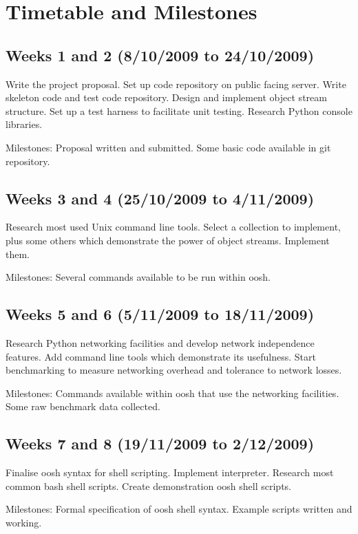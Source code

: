\documentclass[12pt]{article}
\begin{document}
\section*{Timetable and Milestones}

\subsection*{Weeks 1 and 2 (8/10/2009 to 24/10/2009)}
Write the project proposal. Set up code repository on public facing
server. Write skeleton code and test code repository. Design and
implement object stream structure. Set up a test harness to facilitate
unit testing. Research Python console libraries.

Milestones: Proposal written and submitted. Some basic code available
in git repository.

\subsection*{Weeks 3 and 4 (25/10/2009 to 4/11/2009)}
Research most used Unix command line tools. Select a collection to
implement, plus some others which demonstrate the power of object
streams. Implement them.

Milestones: Several commands available to be run within oosh.

\subsection*{Weeks 5 and 6 (5/11/2009 to 18/11/2009)}
Research Python networking facilities and develop network independence
features. Add command line tools which demonstrate its
usefulness. Start benchmarking to measure networking overhead and
tolerance to network losses.

Milestones: Commands available within oosh that use the networking
facilities. Some raw benchmark data collected.

\subsection*{Weeks 7 and 8 (19/11/2009 to 2/12/2009)}
Finalise oosh syntax for shell scripting. Implement
interpreter. Research most common bash shell scripts. Create
demonstration oosh shell scripts.

Milestones: Formal specification of oosh shell syntax. Example scripts
written and working.
\end{document}
